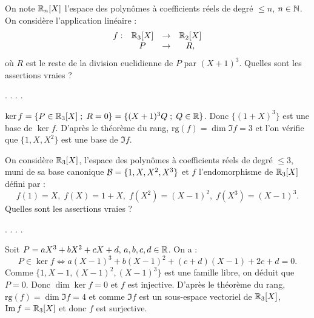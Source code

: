 \begin{question}
On note $\mathbb{R}_n[X]$ l'espace des polynômes à coefficients réels de degré $\le n$, $n\in \mathbb{N}$. On considère l'application linéaire : 
$$\begin{array}{rccc}f:&\mathbb{R}_3[X]&\to&\mathbb{R}_2[X]\\
& P&\to & R,  \end{array}$$
où $R$ est le reste de la division euclidienne de $P$ par $(X+1)^3$. Quelles sont les assertions vraies ?
\begin{answers}  
.
.
.
.
\end{answers}
\begin{explanations}  $\ker f=\{P \in \mathbb{R}_3[X] \; ; \; R=0\}=\{(X+1)^3Q \; ; \; Q\in\mathbb{R}\}$. Donc $\{(1+X)^3\}$ est une base de $\ker f$. D'après le théorème du rang, $\mbox{rg}(f)=\dim \Im f=3$ et l'on vérifie que $\{1,X,X^2\}$ est une base de $\Im f$. 
\end{explanations}
\end{question}

\begin{question}
On considère $\mathbb{R}_3[X]$, l'espace des polynômes à coefficients réels de degré $\le 3$, muni de sa base canonique ${\cal{ B}}= \{1,X,X^2,X^3\} $ et $f$ l'endomorphisme de $\mathbb{R}_3[X]$
défini par :
$$f(1)=X,\;  f(X)=1+X,\; f(X^2)= (X-1)^2,\; f(X^3)=(X-1)^3.$$
Quelles sont les assertions vraies ?
\begin{answers}  
.
.
.
.
\end{answers}
\begin{explanations}  Soit $P= aX^3+bX^2+cX+d,\, a,b,c,d \in \mathbb{R} $. On a :
$$P\in \ker f\Leftrightarrow a(X-1)^3+b(X-1)^2+(c+d)(X-1)+2c+d=0.$$ Comme $\{1,X-1,(X-1)^2,(X-1)^3\}$ est une famille libre, on déduit que $P=0$. Donc $\dim \ker f=0$ et $f$ est injective.
\vskip0mm
D'après le théorème du rang, $\mbox{rg}(f)=\dim \Im f=4$ et comme $\Im f$ est un sous-espace vectoriel de $\mathbb{R}_3[X]$, $\mathop{\mathrm{Im}}\nolimits f=\mathbb{R}_3[X]$ et donc $f$ est surjective.
\end{explanations}
\end{question}

